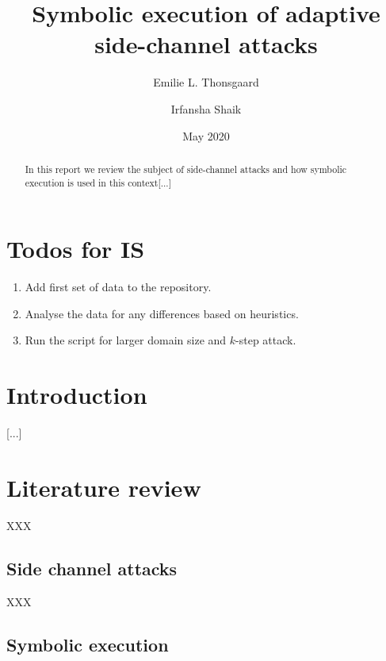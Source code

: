 \documentclass[11pt,a4paper,notitlepage]{article}
\title{Symbolic execution of adaptive side-channel attacks}
\author{Emilie L. Thonsgaard \and Irfansha Shaik}
\date{May 2020}
\begin{document}
\begin{titlingpage}
    \maketitle
    \begin{abstract}
        In this report we review the subject of side-channel attacks and how symbolic execution is used in this context[...]
    \end{abstract}
\end{titlingpage}

\tableofcontents
\newpage
\setcounter{section}{-1}


\section{Todos for IS}
\label{sec:todosforis}

\begin{enumerate}
  \item Add first set of data to the repository.
  \item Analyse the data for any differences based on heuristics.
  \item Run the script for larger domain size and $k$-step attack.
\end{enumerate}

\newpage

\section{Introduction}
\label{cha:introduction}

[...]

\newpage

\section{Literature review}
\label{cha:literaturereview}

XXX

\subsection{Side channel attacks}
\label{sec:sidechannelattacks}

XXX 

\subsection{Symbolic execution}
\label{sec:symbolicexecution}
\end{document}

